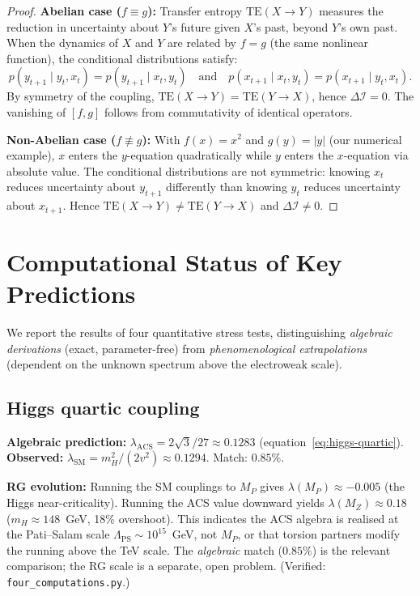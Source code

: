 \documentclass[11pt,a4paper]{article}
\theoremstyle{plain}
\theoremstyle{definition}
\theoremstyle{remark}
\newcommand{\DI}{\Delta\mathcal{I}}
\newcommand{\TE}{\mathrm{TE}}
\begin{document}
\begin{proof}
\textbf{Abelian case ($f \equiv g$):}
Transfer entropy $\TE(X \to Y)$ measures the reduction in uncertainty 
about $Y$'s future given $X$'s past, beyond $Y$'s own past.
When the dynamics of $X$ and $Y$ are related by $f = g$ (the same 
nonlinear function), the conditional distributions satisfy:
\[
  p(y_{t+1} \mid y_t, x_t) = p(y_{t+1} \mid x_t, y_t)
  \quad\text{and}\quad
  p(x_{t+1} \mid x_t, y_t) = p(x_{t+1} \mid y_t, x_t).
\]
By symmetry of the coupling, $\TE(X \to Y) = \TE(Y \to X)$, 
hence $\DI = 0$.  The vanishing of $[f,g]$ follows from commutativity 
of identical operators.

\textbf{Non-Abelian case ($f \not\equiv g$):}
With $f(x) = x^2$ and $g(y) = |y|$ (our numerical example), 
$x$ enters the $y$-equation quadratically while $y$ enters the 
$x$-equation via absolute value.  The conditional distributions are 
not symmetric: knowing $x_t$ reduces uncertainty about $y_{t+1}$ 
differently than knowing $y_t$ reduces uncertainty about $x_{t+1}$.
Hence $\TE(X{\to}Y) \neq \TE(Y{\to}X)$ and $\DI \neq 0$.
\end{proof}

\clearpage
\section{Computational Status of Key Predictions}
\label{app:stress-tests}

We report the results of four quantitative stress tests,
distinguishing \emph{algebraic derivations} (exact, parameter-free)
from \emph{phenomenological extrapolations} (dependent on the unknown
spectrum above the electroweak scale).

\subsection*{Higgs quartic coupling}

\textbf{Algebraic prediction:} $\lambda_{\mathrm{ACS}} = 2\sqrt{3}/27
\approx 0.1283$ (equation~\eqref{eq:higgs-quartic}).
\textbf{Observed:} $\lambda_{\mathrm{SM}} = m_H^2/(2v^2) \approx 0.1294$.
Match: $0.85\%$.

\textbf{RG evolution:} Running the SM couplings to $M_P$ gives
$\lambda(M_P) \approx -0.005$ (the Higgs near-criticality).
Running the ACS value downward yields $\lambda(M_Z) \approx 0.18$
($m_H \approx 148$~GeV, 18\% overshoot).  This indicates
the ACS algebra is realised at the Pati--Salam scale
$\Lambda_{\mathrm{PS}} \sim 10^{15}$~GeV, not $M_P$, or that
torsion partners modify the running above the TeV scale.
The \emph{algebraic} match ($0.85\%$) is the relevant comparison;
the RG scale is a separate, open problem.
(Verified: \texttt{four\_computations.py}.)
\end{document}
